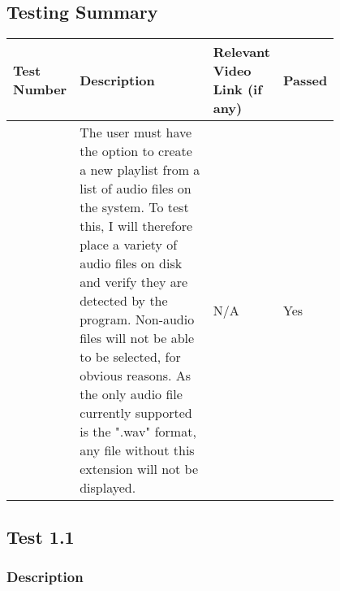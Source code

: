 \pagebreak
\subsection{Testing Summary}
{
	\renewcommand{\arraystretch}{1.5}
	\begin{table}[h!]
		\begin{center}
			\begin{tabularx}{1.0 \textwidth} {
					| >{\raggedright\arraybackslash}p{0.15\linewidth} 
					| >{\raggedright\arraybackslash}p{0.5\linewidth}
					| >{\raggedright\arraybackslash}X 
					|>{\raggedright\arraybackslash}p{0.15\linewidth}
					|
				}
				\hline
				Test Number & Description & Relevant Video Link (if any) & Passed \\
				
				\hline
				1.1 & The user must have the option to create a new playlist from a list of audio files on the system.  To test this, I will therefore place a variety of audio files on disk and verify they are detected by the program. Non-audio files will not be able to be selected, for obvious reasons. As the only audio file currently supported is the ".wav" format, any file without this extension will not be displayed. & N/A & Yes
				\\
				
				
				\hline
			\end{tabularx}
		\end{center}
	\end{table}
}

\pagebreak
\subsection{Test 1.1}
\subsubsection{Description}
\paragraph{}
{
	\centering
}

